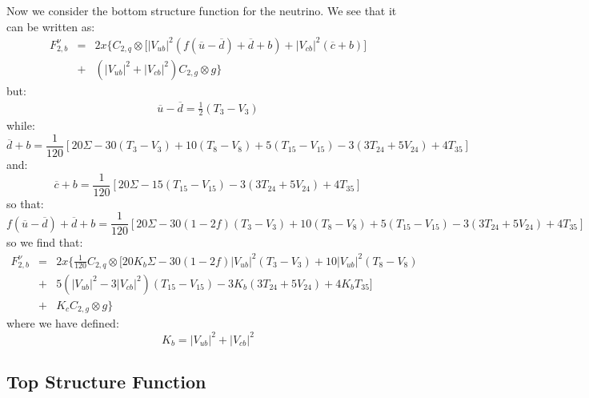 \documentclass[10pt,a4paper]{article}
\begin{document}
Now we consider the bottom structure function for the neutrino. We see
that it can be written as:
\begin{equation}
\begin{array}{rcl}
F_{2,b}^{\nu} &=& 2x\Big\{C_{2,q}\otimes\Big[|V_{ub}|^2 (f(\overline{u}-\overline{d})+\overline{d}+b) + |V_{cb}|^2 (\overline{c}+b)\Big]\\
              &+& \left(|V_{ub}|^2+|V_{cb}|^2\right)C_{2,g}\otimes g\Big\}
\end{array}
\end{equation}
but:
\begin{equation}
\begin{array}{l}
\displaystyle \overline{u} - \overline{d} = \frac12(T_3-V_3)
\end{array}
\end{equation}
while:
\begin{equation}
\overline{d}+b = \frac1{120}[20\Sigma-30(T_3-V_3)+10(T_8-V_8)+5(T_{15}-V_{15})-3(3T_{24}+5V_{24})+4T_{35}]
\end{equation}
and:
\begin{equation}
\overline{c}+b = \frac1{120}[20\Sigma-15(T_{15}-V_{15})-3(3T_{24}+5V_{24})+4T_{35}]
\end{equation}
so that:
\begin{equation}
f(\overline{u}-\overline{d})+\overline{d}+b = \frac1{120}[20\Sigma-30(1-2f)(T_3-V_3)+10(T_8-V_8)+5(T_{15}-V_{15})-3(3T_{24}+5V_{24})+4T_{35}]
\end{equation}
so we find that:
\begin{equation}
\begin{array}{rcl}  
F_{2,b}^{\nu} &=& \displaystyle 2x\Bigg\{\frac1{120}C_{2,q}\otimes\Bigg[20K_b\Sigma-30(1-2f)|V_{ub}|^2(T_3-V_3)+10|V_{ub}|^2(T_8-V_8)\\
              &+& \displaystyle 5(|V_{ub}|^2-3|V_{cb}|^2)(T_{15}-V_{15})-3K_b(3T_{24}+5V_{24})+4K_bT_{35}\Bigg]\\
              &+& K_cC_{2,g}\otimes g\Bigg\}
\end{array}
\end{equation}
where we have defined:
\begin{equation}
K_b = |V_{ub}|^2+|V_{cb}|^2
\end{equation}

\subsection{Top Structure Function}
\end{document}
